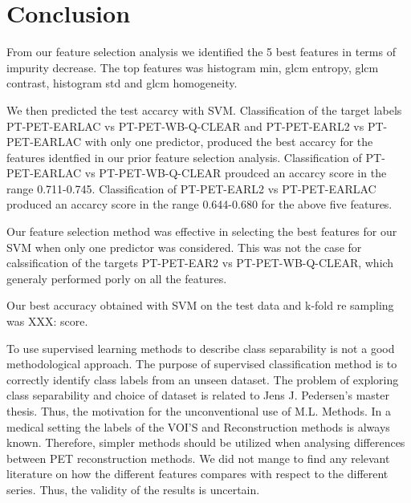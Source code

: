 \section{Conclusion}

From our feature selection analysis we identified the 5 best features in terms
of impurity decrease. The top features was histogram min, glcm entropy, glcm
contrast, histogram std and glcm homogeneity. 

We then predicted the test accarcy with SVM. Classification of the target
labels PT-PET-EARLAC vs PT-PET-WB-Q-CLEAR and PT-PET-EARL2 vs PT-PET-EARLAC
with only one predictor, produced the best accarcy for the features identfied
in our prior feature selection analysis. 
Classification of PT-PET-EARLAC vs PT-PET-WB-Q-CLEAR proudced an accarcy score
in the range 0.711-0.745. 
Classification of PT-PET-EARL2 vs PT-PET-EARLAC produced an accarcy score in
the range 0.644-0.680 for the above five features. 

Our feature selection method was
effective in selecting the best features for our SVM when only one predictor
was considered. 
This was not the case for calssification of the targets PT-PET-EAR2 vs
PT-PET-WB-Q-CLEAR, which generaly performed porly on all the features. 





Our best accuracy obtained with SVM on the test data and k-fold re sampling
was XXX: score.

To use supervised learning methods to describe class separability is not a
good methodological approach. The purpose of supervised classification
method is to correctly identify class labels from an unseen dataset.     
The problem of exploring class separability and choice of dataset is
related to Jens J. Pedersen's master thesis. Thus, the motivation for the 
unconventional use of M.L. Methods. In a medical setting the labels of the
VOI'S and Reconstruction methods is always known. Therefore, simpler methods
should be utilized when analysing differences between PET reconstruction
methods. We did not mange to find any relevant literature on how the different features compares
with respect to the different series. Thus, the validity of the results is
uncertain. 
 




% 
